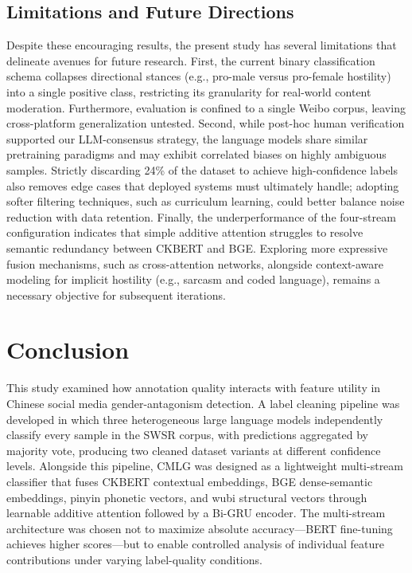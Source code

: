﻿\documentclass[12pt]{article}
\begin{document}
\subsection{Limitations and Future Directions}
Despite these encouraging results, the present study has several limitations that delineate avenues for future research. First, the current binary classification schema collapses directional stances (e.g., pro-male versus pro-female hostility) into a single positive class, restricting its granularity for real-world content moderation. Furthermore, evaluation is confined to a single Weibo corpus, leaving cross-platform generalization untested. Second, while post-hoc human verification supported our LLM-consensus strategy, the language models share similar pretraining paradigms and may exhibit correlated biases on highly ambiguous samples. Strictly discarding 24\% of the dataset to achieve high-confidence labels also removes edge cases that deployed systems must ultimately handle; adopting softer filtering techniques, such as curriculum learning, could better balance noise reduction with data retention. Finally, the underperformance of the four-stream configuration indicates that simple additive attention struggles to resolve semantic redundancy between CKBERT and BGE. Exploring more expressive fusion mechanisms, such as cross-attention networks, alongside context-aware modeling for implicit hostility (e.g., sarcasm and coded language), remains a necessary objective for subsequent iterations.

\section{Conclusion}
This study examined how annotation quality interacts with feature utility in Chinese social media gender-antagonism detection. A label cleaning pipeline was developed in which three heterogeneous large language models independently classify every sample in the SWSR corpus, with predictions aggregated by majority vote, producing two cleaned dataset variants at different confidence levels. Alongside this pipeline, CMLG was designed as a lightweight multi-stream classifier that fuses CKBERT contextual embeddings, BGE dense-semantic embeddings, pinyin phonetic vectors, and wubi structural vectors through learnable additive attention followed by a Bi-GRU encoder. The multi-stream architecture was chosen not to maximize absolute accuracy---BERT fine-tuning achieves higher scores---but to enable controlled analysis of individual feature contributions under varying label-quality conditions.
\end{document}
